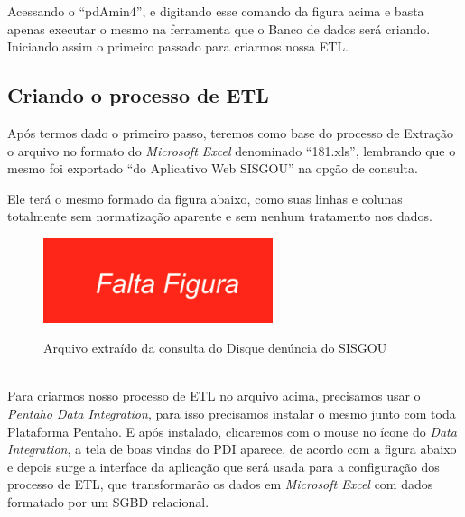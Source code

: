 Acessando o ``pdAmin4'', e digitando esse comando da figura acima e basta apenas executar o mesmo na ferramenta 
que o Banco de dados ser\'{a} criando. Iniciando assim o primeiro passado para criarmos nossa ETL.

\subsection{Criando o processo de ETL}

Ap\'os termos dado o primeiro passo, teremos como base do processo de Extra\c{c}\~{a}o o arquivo no 
formato do \textit{Microsoft Excel} denominado ``181.xls'', lembrando que o mesmo foi exportado ``do 
Aplicativo Web SISGOU'' na op\c{c}\~{a}o de consulta. 

Ele ter\'{a} o mesmo formado da figura abaixo, como suas 
linhas e colunas totalmente sem normatiza\c{c}\~{a}o aparente e sem nenhum tratamento nos dados.

\begin{figure}[H]
	\vspace*{0,2cm}
    \centering
    \caption{Arquivo extra\'{i}do da consulta do Disque denúncia do  SISGOU}
    \includegraphics[width=0.6\textwidth]{./04-figuras/falta-figura.png}
    \label{fig:ilustfigfaltafigura01}
\end{figure}
\vspace*{-0,9cm}
{\raggedright {}} \\

Para criarmos nosso processo de ETL no arquivo acima, precisamos usar o \textit{Pentaho Data Integration}, para isso precisamos instalar o mesmo junto com toda Plataforma Pentaho. E ap\'os instalado,  clicaremos com o mouse no \'{i}cone do \textit{Data Integration}, a tela de boas vindas do PDI aparece, de acordo com a figura abaixo e depois surge a interface da aplica\c{c}\~{a}o que ser\'{a} usada para a configura\c{c}\~{a}o dos processo de ETL, que transformar\~{a}o os dados em \textit{Microsoft Excel} com dados formatado por um SGBD relacional.


